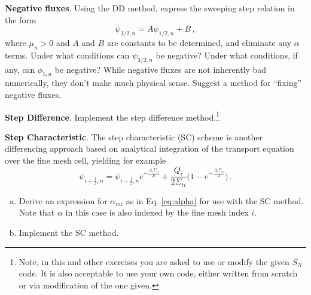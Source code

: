 \begin{exercises}

  \item \textbf{Negative fluxes}. Using the DD method, express the sweeping step relation in the form
  \begin{equation*}
    \psi_{3/2,n} = A \psi_{1/2,n} + B \, ,
  \end{equation*}
  where $\mu_n > 0$ and $A$ and $B$ are constants to be determined, and eliminate any $\alpha$ terms.  Under what conditions can $\psi_{3/2,n}$ be negative?  Under what conditions, if any, can $\phi_{1,n}$ be negative?  While negative fluxes are not inherently bad numerically, they don't make much physical sense.  Suggest a method for ``fixing'' negative fluxes.

  \item \textbf{Step Difference}.  Implement the step difference method.\footnote{Note, in this and other exercises you are asked to use or modify the given $S_N$ code.  It is also acceptable to use your own code, either written from scratch or via modification of the one given.}

  \item \textbf{Step Characteristic}.  The step characteristic (SC) scheme is another differencing approach based on analytical integration of the transport equation over the fine mesh cell, yielding for example
  \begin{equation*}
    \psi_{i+\frac{1}{2},n}  =  \psi_{i-\frac{1}{2},n} e^{- \frac{\Delta_i \Sigma_{ti}}{\mu}} + \frac{Q_i}{2\Sigma_{ti}} \Big ( 1-e^{-\frac{\Delta_i \Sigma_{ti}}{\mu}} \Big ) \, .
  \end{equation*}
  \begin{enumerate}[(a)]
    \item Derive an expression for $\alpha_{mi}$ as in Eq. \ref{eq:alpha} for use with the SC method.  Note that $\alpha$ in this case is also indexed by the fine mesh index $i$. 
    \item Implement the SC method.
  \end{enumerate}
 

\end{exercises}
